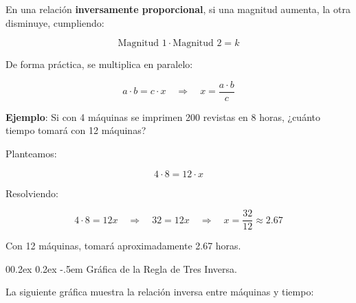 \documentclass[
  stu,
  floatsintext,
  longtable,
  a4paper,
  nolmodern,
  notxfonts,
  notimes,
  12pt,
  colorlinks=true,linkcolor=blue,citecolor=blue,urlcolor=blue]{apa7}
\makeatletter
\renewcommand{\paragraph}{\@startsection{paragraph}{4}{\parindent}%
	{0\baselineskip \@plus 0.2ex \@minus 0.2ex}%
	{-.5em}%
	{\normalfont\normalsize\bfseries\typesectitle}}
\makeatother
\begin{document}
En una relación \textbf{inversamente proporcional}, si una magnitud
aumenta, la otra disminuye, cumpliendo:

\[
\text{Magnitud 1} \cdot \text{Magnitud 2} = k
\]

De forma práctica, se multiplica en paralelo:

\[
a \cdot b = c \cdot x \quad \Rightarrow \quad x = \frac{a \cdot b}{c}
\]

\textbf{Ejemplo}: Si con 4 máquinas se imprimen 200 revistas en 8 horas,
¿cuánto tiempo tomará con 12 máquinas?

Planteamos:

\[
4 \cdot 8 = 12 \cdot x
\]

Resolviendo:

\[
4 \cdot 8 = 12x \quad \Rightarrow \quad 32 = 12x \quad \Rightarrow \quad x = \frac{32}{12} \approx 2.67
\]

Con 12 máquinas, tomará aproximadamente 2.67 horas.

\paragraph{Gráfica de la Regla de Tres
Inversa.}\label{gruxe1fica-de-la-regla-de-tres-inversa}

La siguiente gráfica muestra la relación inversa entre máquinas y
tiempo:
\end{document}
